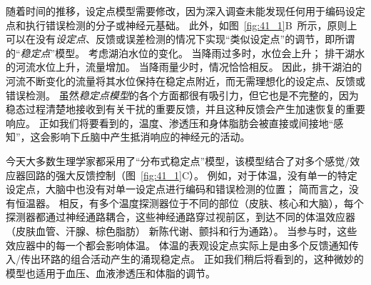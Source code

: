 随着时间的推移，设定点模型需要修改，因为深入调查未能发现任何用于编码设定点和执行错误检测的分子或神经元基础。
此外，如图~\ref{fig:41_1}B~所示，原则上可以在没有\textit{设定点}、反馈或误差检测的情况下实现“类似设定点”的调节，即所谓的“\textit{稳定点}”模型。
考虑湖泊水位的变化。
当降雨过多时，水位会上升；
排干湖水的河流水位上升，流量增加。
当降雨量少时，情况恰恰相反。
因此，排干湖泊的河流不断变化的流量将其水位保持在稳定点附近，而无需理想化的设定点、反馈或错误检测。
虽然\textit{稳定点模型}的各个方面都很有吸引力，但它也是不完整的，因为稳态过程清楚地接收到有关干扰的重要反馈，并且这种反馈会产生加速恢复的重要响应。
正如我们将要看到的，温度、渗透压和身体脂肪会被直接或间接地“感知”，这会影响下丘脑中产生抵消响应的神经元的活动。


今天大多数生理学家都采用了“分布式稳定点”模型，该模型结合了对多个感觉/效应器回路的强大反馈控制（图~\ref{fig:41_1}C）。
例如，对于体温，没有单一的特定设定点，大脑中也没有对单一设定点进行编码和错误检测的位置；
简而言之，没有恒温器。
相反，有多个温度探测器位于不同的部位（皮肤、核心和大脑），每个探测器都通过神经通路耦合，这些神经通路穿过视前区，到达不同的体温效应器（皮肤血管、汗腺、棕色脂肪） 新陈代谢、颤抖和行为通路）。
当参与时，这些效应器中的每一个都会影响体温。
体温的表观设定点实际上是由多个反馈通知传入/传出环路的组合活动产生的涌现稳定点。
正如我们稍后将看到的，这种微妙的模型也适用于血压、血液渗透压和体脂的调节。


